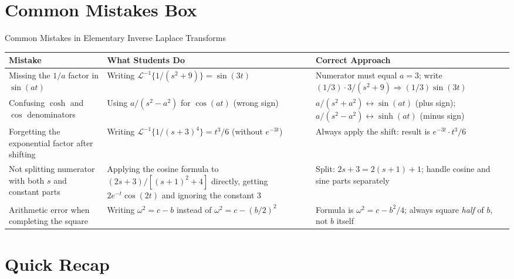 \documentclass[12pt,a4paper]{article}
\begin{document}
\section{Common Mistakes Box}

\begin{mistakebox}{Common Mistakes in Elementary Inverse Laplace Transforms}
\begin{tabular}{@{}p{3.8cm}p{4.8cm}p{5cm}@{}}
\toprule
\textbf{Mistake} & \textbf{What Students Do} & \textbf{Correct Approach} \\
\midrule
Missing the $1/a$ factor in $\sin(at)$ &
  Writing $\mathcal{L}^{-1}\{1/(s^2+9)\} = \sin(3t)$ &
  Numerator must equal $a=3$; write $(1/3)\cdot 3/(s^2+9) \Rightarrow (1/3)\sin(3t)$ \\
\midrule
Confusing $\cosh$ and $\cos$ denominators &
  Using $a/(s^2-a^2)$ for $\cos(at)$ (wrong sign) &
  $a/(s^2+a^2) \leftrightarrow \sin(at)$ (plus sign); $a/(s^2-a^2) \leftrightarrow \sinh(at)$ (minus sign) \\
\midrule
Forgetting the exponential factor after shifting &
  Writing $\mathcal{L}^{-1}\{1/(s+3)^4\} = t^3/6$ (without $e^{-3t}$) &
  Always apply the shift: result is $e^{-3t}\cdot t^3/6$ \\
\midrule
Not splitting numerator with both $s$ and constant parts &
  Applying the cosine formula to $(2s+3)/[(s+1)^2+4]$ directly, getting $2e^{-t}\cos(2t)$ and ignoring the constant 3 &
  Split: $2s+3 = 2(s+1)+1$; handle cosine and sine parts separately \\
\midrule
Arithmetic error when completing the square &
  Writing $\omega^2 = c - b$ instead of $\omega^2 = c - (b/2)^2$ &
  Formula is $\omega^2 = c - b^2/4$; always square \emph{half} of $b$, not $b$ itself \\
\bottomrule
\end{tabular}
\end{mistakebox}

\section{Quick Recap}
\end{document}
